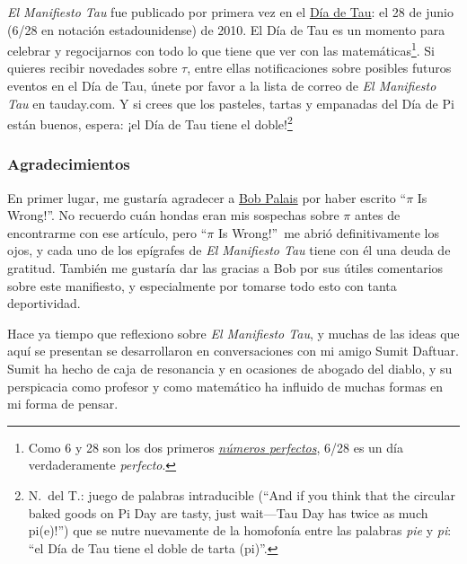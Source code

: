\emph{El Manifiesto Tau} fue publicado por primera vez en el \href{http://tauday.com/}{Día de Tau}: el 28 de junio (6/28 en notación estadounidense) de 2010. El Día de Tau es un momento para celebrar y regocijarnos con todo lo que tiene que ver con las matemáticas\footnote{Como 6 y 28 son los dos primeros \href{https://es.wikipedia.org/wiki/Número_perfecto}{\emph{números perfectos}}, 6/28 es un día verdaderamente \emph{perfecto}.}. Si quieres recibir novedades sobre $\tau$, entre ellas notificaciones sobre posibles futuros eventos en el Día de Tau, únete por favor a la lista de correo de \emph{El Manifiesto Tau} en tauday.com. Y si crees que los pasteles, tartas y empanadas del Día de Pi están buenos, espera: ¡el Día de Tau tiene el doble!\footnote{N.~del T.: juego de palabras intraducible (``And if you think that the circular baked goods on Pi Day are tasty, just wait---Tau Day has twice as much pi(e)!'') que se nutre nuevamente de la homofonía entre las palabras \emph{pie} y \emph{pi}: ``el Día de Tau tiene el doble de tarta (pi)''.}



\renewcommand{\thesubsubsection}{6.283}

  \subsubsection{Agradecimientos} %
  \label{sec:acknowledgments}

En primer lugar, me gustaría agradecer a \href{http://www.math.utah.edu/~palais}{Bob Palais} por haber escrito ``$\pi$ Is Wrong!''. No recuerdo cuán hondas eran mis sospechas sobre $\pi$ antes de encontrarme con ese artículo, pero ``$\pi$ Is Wrong!''\ me abrió definitivamente los ojos, y cada uno de los epígrafes de \emph{El Manifiesto Tau} tiene con él una deuda de gratitud. También me gustaría dar las gracias a Bob por sus útiles comentarios sobre este manifiesto, y especialmente por tomarse todo esto con tanta deportividad.

Hace ya tiempo que reflexiono sobre \emph{El Manifiesto Tau}, y muchas de las ideas que aquí se presentan se desarrollaron en conversaciones con mi amigo Sumit Daftuar. Sumit ha hecho de caja de resonancia y en ocasiones de abogado del diablo, y su perspicacia como profesor y como matemático ha influido de muchas formas en mi forma de pensar.

